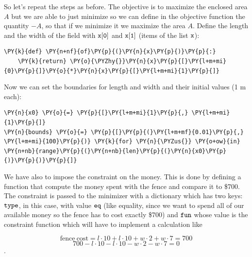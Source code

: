So let's repeat the steps as before. The objective is to maximize the
enclosed area \(A\) but we are able to just minimize so we can define in the objective function the quantity \(-A\), so that if we minimize it
we maximize the area $A$. Define the length and the width of the field with \(\tt{x[0]}\) and
\(\tt{x[1]}\) (items of the list \(\tt{x}\)):

    \begin{tcolorbox}[breakable, size=fbox, boxrule=1pt, pad at break*=1mm,colback=cellbackground, colframe=cellborder]
\begin{Verbatim}[commandchars=\\\{\}]
\PY{k}{def} \PY{n+nf}{of}\PY{p}{(}\PY{n}{x}\PY{p}{)}\PY{p}{:}
    \PY{k}{return} \PY{o}{\PYZhy{}}\PY{n}{x}\PY{p}{[}\PY{l+m+mi}{0}\PY{p}{]}\PY{o}{*}\PY{n}{x}\PY{p}{[}\PY{l+m+mi}{1}\PY{p}{]}
\end{Verbatim}
\end{tcolorbox}

    Now we can set the boundaries for length and width and their initial
values (1 m each):

    \begin{tcolorbox}[breakable, size=fbox, boxrule=1pt, pad at break*=1mm,colback=cellbackground, colframe=cellborder]
\begin{Verbatim}[commandchars=\\\{\}]
\PY{n}{x0} \PY{o}{=} \PY{p}{[}\PY{l+m+mi}{1}\PY{p}{,} \PY{l+m+mi}{1}\PY{p}{]}
\PY{n}{bounds} \PY{o}{=} \PY{p}{[}\PY{p}{(}\PY{l+m+mf}{0.01}\PY{p}{,} \PY{l+m+mi}{100}\PY{p}{)} \PY{k}{for} \PY{n}{\PYZus{}} \PY{o+ow}{in} \PY{n+nb}{range}\PY{p}{(}\PY{n+nb}{len}\PY{p}{(}\PY{n}{x0}\PY{p}{)}\PY{p}{)}\PY{p}{]}
\end{Verbatim}
\end{tcolorbox}

    We have also to impose the constraint on the money. This is done by
defining a function that compute the money spent with the fence and
compare it to \$700. The constraint is passed to the minimizer with a
dictionary which has two keys: \(\tt{type}\), in this case, with value \(\tt{eq}\)
(like equality, since we want to spend all of our available money so the
fence has to cost exactly \$700) and \(\tt{fun}\) whose value is the constraint function which will have to implement a calculation like

\[\mathrm{fence~cost} = l\cdot10 + l\cdot10 + w\cdot2 + w\cdot7 = 700\]
\[700 - l\cdot10 - l\cdot10 - w\cdot2 - w\cdot7 = 0\].

